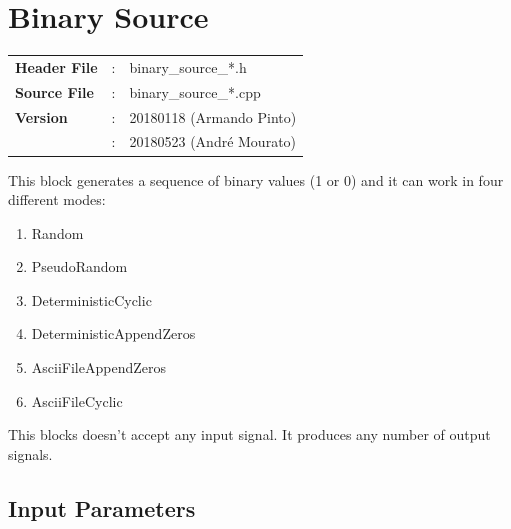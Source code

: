 \clearpage

\section{Binary Source}

\begin{tcolorbox}	
	\begin{tabular}{p{2.75cm} p{0.2cm} p{10.5cm}} 	
		\textbf{Header File}   &:& binary\_source\_*.h \\
		\textbf{Source File}   &:& binary\_source\_*.cpp \\
        \textbf{Version}       &:& 20180118 (Armando Pinto)\\
                               &:& 20180523 (Andr\'e Mourato)
	\end{tabular}
\end{tcolorbox}

\maketitle
This block generates a sequence of binary values (1 or 0) and it can work in four different modes:

\begin{multicols}{3}
\begin{enumerate}
	\item Random
	\item PseudoRandom
	\item DeterministicCyclic
	\item DeterministicAppendZeros
    \item AsciiFileAppendZeros
    \item AsciiFileCyclic
\end{enumerate}
\end{multicols}

This blocks doesn't accept any input signal. It produces any number of output signals.

\subsection*{Input Parameters}


